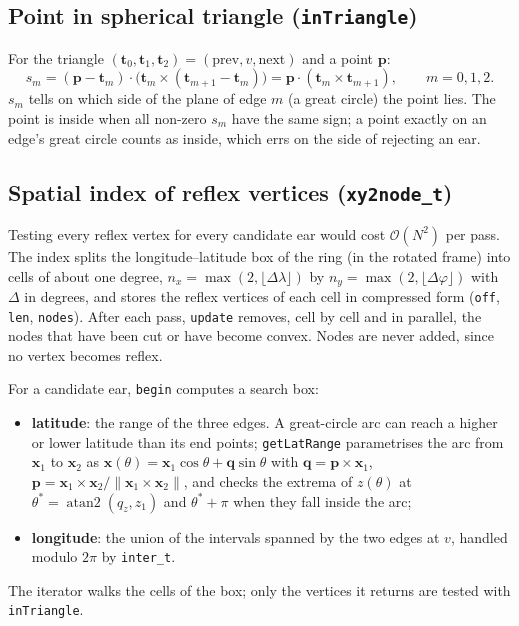 \documentclass[11pt,a4paper]{article}
\newcommand{\code}[1]{\texttt{#1}}
\newcommand{\vx}{\mathbf{x}}
\begin{document}
\subsection{Point in spherical triangle (\code{inTriangle})}

For the triangle $(\mathbf t_0,\mathbf t_1,\mathbf t_2) = (\text{prev}, v, \text{next})$ and a
point $\mathbf p$:
\[
s_m = (\mathbf p - \mathbf t_m)\cdot\bigl(\mathbf t_m\times(\mathbf t_{m+1}-\mathbf t_m)\bigr)
    = \mathbf p\cdot(\mathbf t_m\times\mathbf t_{m+1}),\qquad m = 0,1,2.
\]
$s_m$ tells on which side of the plane of edge $m$ (a great circle) the point lies. The point is
inside when all non-zero $s_m$ have the same sign; a point exactly on an edge's great circle counts
as inside, which errs on the side of rejecting an ear.

\subsection{Spatial index of reflex vertices (\code{xy2node\_t})}

Testing every reflex vertex for every candidate ear would cost $\mathcal{O}(N^2)$ per pass. The
index splits the longitude--latitude box of the ring (in the rotated frame) into cells of about one
degree, $n_x = \max(2,\lfloor\Delta\lambda\rfloor)$ by $n_y = \max(2,\lfloor\Delta\varphi\rfloor)$
with $\Delta$ in degrees, and stores the reflex vertices of each cell in compressed form
(\code{off}, \code{len}, \code{nodes}). After each pass, \code{update} removes, cell by cell and
in parallel, the nodes that have been cut or have become convex. Nodes are never added, since no
vertex becomes reflex.

For a candidate ear, \code{begin} computes a search box:
\begin{itemize}
\item \textbf{latitude}: the range of the three edges. A great-circle arc can reach a higher or
  lower latitude than its end points; \code{getLatRange} parametrises the arc from $\vx_1$ to
  $\vx_2$ as $\vx(\theta) = \vx_1\cos\theta + \mathbf q\sin\theta$ with
  $\mathbf q = \mathbf p\times\vx_1$, $\mathbf p = \vx_1\times\vx_2/\|\vx_1\times\vx_2\|$, and
  checks the extrema of $z(\theta)$ at $\theta^* = \operatorname{atan2}(q_z, z_1)$ and
  $\theta^*+\pi$ when they fall inside the arc;
\item \textbf{longitude}: the union of the intervals spanned by the two edges at $v$, handled
  modulo $2\pi$ by \code{inter\_t}.
\end{itemize}
The iterator walks the cells of the box; only the vertices it returns are tested with
\code{inTriangle}.
\end{document}
